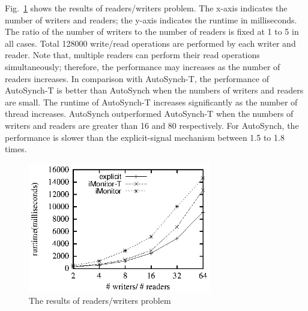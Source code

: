 \documentclass[preprint]{sigplanconf}
\begin{document}
Fig.~\ref{fig:rw_eval} shows the results of readers/writers problem. The
x-axis indicates the number of writers and readers; the y-axis indicates the
runtime in milliseconds. The ratio of the number of writers to the number of
readers is fixed at 1 to 5 in all cases. Total 128000 write/read operations are
performed by each writer and reader. Note that, multiple readers can perform
their read operations simultaneously; therefore, the performance may increases
as the number of readers increases. In comparison with AutoSynch-T, the
performance of AutoSynch-T is better than AutoSynch when the numbers of writers
and readers are small. The runtime of AutoSynch-T increases significantly as 
the number of thread increases. AutoSynch outperformed AutoSynch-T when the
numbers of writers and readers are greater than 16 and 80 respectively. For 
AutoSynch, the performance is slower than the explicit-signal mechanism between 
1.5 to 1.8 times.


\begin{figure}[ht!]
  \centering
  \includegraphics[width=80mm]{fig/trw.eps}
  \caption{The results of readers/writers problem}
  \label{fig:rw_eval}
\end{figure}


\end{document}
